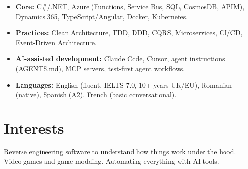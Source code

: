 \documentclass[11pt,a4paper]{article}
\begin{document}
\begin{itemize}
\item \textbf{Core:} C\#/.NET, Azure (Functions, Service Bus, SQL, CosmosDB, APIM), Dynamics 365, TypeScript/Angular, Docker, Kubernetes.
\item \textbf{Practices:} Clean Architecture, TDD, DDD, CQRS, Microservices, CI/CD, Event-Driven Architecture.
\item \textbf{AI-assisted development:} Claude Code, Cursor, agent instructions (AGENTS.md), MCP servers, test-first agent workflows.
\item \textbf{Languages:} English (fluent, IELTS 7.0, 10+ years UK/EU), Romanian (native), Spanish (A2), French (basic conversational).
\end{itemize}

\bigskip

\section{Interests}

Reverse engineering software to understand how things work under the hood. Video games and game modding. Automating everything with AI tools.
\end{document}
